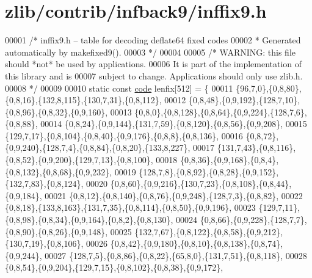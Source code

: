 \hypertarget{zlib_2contrib_2infback9_2inffix9_8h_source}{}\section{zlib/contrib/infback9/inffix9.h}
\label{zlib_2contrib_2infback9_2inffix9_8h_source}

\begin{DoxyCode}
00001     \textcolor{comment}{/* inffix9.h -- table for decoding deflate64 fixed codes}
00002 \textcolor{comment}{     * Generated automatically by makefixed9().}
00003 \textcolor{comment}{     */}
00004 
00005     \textcolor{comment}{/* WARNING: this file should *not* be used by applications.}
00006 \textcolor{comment}{       It is part of the implementation of this library and is}
00007 \textcolor{comment}{       subject to change. Applications should only use zlib.h.}
00008 \textcolor{comment}{     */}
00009 
00010     \textcolor{keyword}{static} \textcolor{keyword}{const} \hyperlink{structcode}{code} lenfix[512] = \{
00011         \{96,7,0\},\{0,8,80\},\{0,8,16\},\{132,8,115\},\{130,7,31\},\{0,8,112\},
00012         \{0,8,48\},\{0,9,192\},\{128,7,10\},\{0,8,96\},\{0,8,32\},\{0,9,160\},
00013         \{0,8,0\},\{0,8,128\},\{0,8,64\},\{0,9,224\},\{128,7,6\},\{0,8,88\},
00014         \{0,8,24\},\{0,9,144\},\{131,7,59\},\{0,8,120\},\{0,8,56\},\{0,9,208\},
00015         \{129,7,17\},\{0,8,104\},\{0,8,40\},\{0,9,176\},\{0,8,8\},\{0,8,136\},
00016         \{0,8,72\},\{0,9,240\},\{128,7,4\},\{0,8,84\},\{0,8,20\},\{133,8,227\},
00017         \{131,7,43\},\{0,8,116\},\{0,8,52\},\{0,9,200\},\{129,7,13\},\{0,8,100\},
00018         \{0,8,36\},\{0,9,168\},\{0,8,4\},\{0,8,132\},\{0,8,68\},\{0,9,232\},
00019         \{128,7,8\},\{0,8,92\},\{0,8,28\},\{0,9,152\},\{132,7,83\},\{0,8,124\},
00020         \{0,8,60\},\{0,9,216\},\{130,7,23\},\{0,8,108\},\{0,8,44\},\{0,9,184\},
00021         \{0,8,12\},\{0,8,140\},\{0,8,76\},\{0,9,248\},\{128,7,3\},\{0,8,82\},
00022         \{0,8,18\},\{133,8,163\},\{131,7,35\},\{0,8,114\},\{0,8,50\},\{0,9,196\},
00023         \{129,7,11\},\{0,8,98\},\{0,8,34\},\{0,9,164\},\{0,8,2\},\{0,8,130\},
00024         \{0,8,66\},\{0,9,228\},\{128,7,7\},\{0,8,90\},\{0,8,26\},\{0,9,148\},
00025         \{132,7,67\},\{0,8,122\},\{0,8,58\},\{0,9,212\},\{130,7,19\},\{0,8,106\},
00026         \{0,8,42\},\{0,9,180\},\{0,8,10\},\{0,8,138\},\{0,8,74\},\{0,9,244\},
00027         \{128,7,5\},\{0,8,86\},\{0,8,22\},\{65,8,0\},\{131,7,51\},\{0,8,118\},
00028         \{0,8,54\},\{0,9,204\},\{129,7,15\},\{0,8,102\},\{0,8,38\},\{0,9,172\},

\end{DoxyCode}
